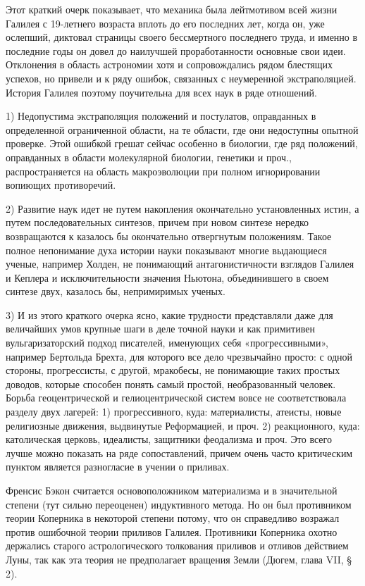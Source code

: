 Этот краткий очерк показывает, что механика была лейтмотивом всей жизни Галилея
с 19-летнего возраста вплоть до его последних лет, когда он, уже ослепший,
диктовал страницы своего бессмертного последнего труда, и именно в последние
годы он довел до наилучшей проработанности основные свои идеи. Отклонения в
область астрономии хотя и сопровождались рядом блестящих успехов, но привели и
к ряду ошибок, связанных с неумеренной экстраполяцией. История Галилея поэтому
поучительна для всех наук в ряде отношений.

1) Недопустима экстраполяция положений и постулатов, оправданных в определенной
ограниченной области, на те области, где они недоступны опытной проверке. Этой
ошибкой грешат сейчас особенно в биологии, где ряд положений, оправданных в
области молекулярной биологии, генетики и проч., распространяется на область
макроэволюции при полном игнорировании вопиющих противоречий.

2) Развитие наук идет не путем накопления окончательно установленных истин, а
путем последовательных синтезов, причем при новом синтезе нередко возвращаются
к казалось бы окончательно отвергнутым положениям. Такое полное непонимание
духа истории науки показывают многие выдающиеся ученые, например Холден, не
понимающий антагонистичности взглядов Галилея и Кеплера и исключительности
значения Ньютона, объединившего в своем синтезе двух, казалось бы, непримиримых
ученых.

3) И из этого краткого очерка ясно, какие трудности представляли даже для
величайших умов крупные шаги в деле точной науки и как примитивен
вульгаризаторский подход писателей, именующих себя «прогрессивными», например
Бертольда Брехта, для которого все дело чрезвычайно просто: с одной стороны,
прогрессисты, с другой, мракобесы, не понимающие таких простых доводов, которые
способен понять самый простой, необразованный человек. Борьба геоцентрической и
гелиоцентрической систем вовсе не соответствовала разделу двух лагерей: 1)
прогрессивного, куда: материалисты, атеисты, новые религиозные движения,
выдвинутые Реформацией, и проч. 2) реакционного, куда: католическая церковь,
идеалисты, защитники феодализма и проч. Это всего лучше можно показать на ряде
сопоставлений, причем очень часто критическим пунктом является разногласие в
учении о приливах.

Френсис Бэкон считается основоположником материализма и в значительной степени
(тут сильно переоценен) индуктивного метода. Но он был противником теории
Коперника в некоторой степени потому, что он справедливо возражал против
ошибочной теории приливов Галилея. Противники Коперника охотно держались
старого астрологического толкования приливов и отливов действием Луны, так как
эта теория не предполагает вращения Земли (Дюгем, глава VII, § 2).

